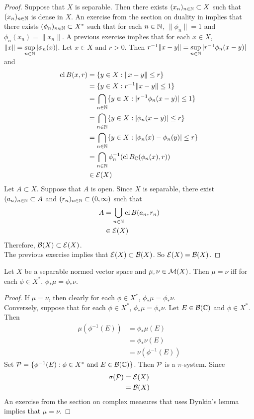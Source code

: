 \documentclass{book}
\begin{document}
	\begin{proof}
		Suppose that $X$ is separable. Then there exists $(x_n)_{n \in \mathbb{N}} \subset X$ such that $(x_n)_{n \in \mathbb{N}}$ is dense in $X$. An exercise from the section on duality in \cite{analysis} implies that there exists $(\phi_n)_{n \in \mathbb{N}} \subset X^*$ such that for each $n \in \mathbb{N}$, $\|\phi_n\| = 1$ and $\phi_n(x_n) = \|x_n\|$. A previous exercise implies that for each $x \in X$, $\|x\| = \sup\limits_{n \in \mathbb{N}} |\phi_n(x)|$. Let $x \in X$ and $r > 0$. Then $r^{-1}\|x - y \| = \sup\limits_{n \in \mathbb{N}} |r^{-1}\phi_n(x - y)|$ and 
		\begin{align*}
			\operatorname{cl} B(x,r)
			& = \{y \in X: \|x -y \| \leq r\} \\
			& = \{y \in X: r^{-1}\|x - y \| \leq 1\} \\
			& = \bigcap_{n \in \mathbb{N}} \{y \in X: |r^{-1}\phi_n(x - y)| \leq 1\} \\
			& = \bigcap_{n \in \mathbb{N}} \{y \in X: |\phi_n(x - y)| \leq r\} \\ 
			& = \bigcap_{n \in \mathbb{N}} \{y \in X: |\phi_n(x) - \phi_n(y)| \leq r\} \\
			& = \bigcap_{n \in \mathbb{N}} \phi_n^{-1}(\operatorname{cl} B_{\mathbb{C}}(\phi_n (x), r)) \\
			& \in \mathcal{E}(X)
		\end{align*}
		Let $A \subset X$. Suppose that $A$ is open. Since $X$ is separable, there exist $(a_n)_{n \in \mathbb{N}} \subset A$ and $(r_n)_{n \in \mathbb{N}} \subset (0, \infty)$ such that 
		\begin{align*}
			A 
			& = \bigcup_{n \in \mathbb{N}} \operatorname{cl} B(a_n, r_n) \\
			& \in \mathcal{E}(X)
		\end{align*}
		Therefore, $\mathcal{B}(X) \subset \mathcal{E}(X)$. \\
		The previous exercise implies that $\mathcal{E}(X) \subset \mathcal{B}(X)$. So $\mathcal{E}(X) = \mathcal{B}(X)$.
	\end{proof}
	
	\begin{ex}
		Let $X$ be a separable normed vector space and $\mu, \nu \in \mathcal{M}(X)$. Then $\mu = \nu$ iff for each $\phi \in X^*$, $\phi_*\mu = \phi_*\nu$.
	\end{ex}
	
	\begin{proof}
		If $\mu = \nu$, then clearly for each $\phi \in X^*$, $\phi_*\mu = \phi_*\nu$. \\
		Conversely, suppose that for each $\phi \in X^*$, $\phi_*\mu = \phi_*\nu$. Let $E \in \mathcal{B}(\mathbb{C})$ and $\phi \in X^*$. Then 
		\begin{align*}
			\mu(\phi^{-1}(E)) 
			& = \phi_*\mu(E) \\
			& = \phi_*\nu(E) \\
			&= \nu(\phi^{-1}(E))
		\end{align*}
		Set $\mathcal{P} = \{\phi^{-1}(E): \phi \in X^* \text{ and } E \in \mathcal{B}(\mathbb{C})\}$. Then $\mathcal{P}$ is a $\pi$-system. Since 
		\begin{align*}
			\sigma(\mathcal{P}) 
			& = \mathcal{E}(X) \\
			& = \mathcal{B}(X)
		\end{align*}
		An exercise from the section on complex measures that uses Dynkin's lemma implies that $\mu = \nu$.
	\end{proof}
	
\end{document}
